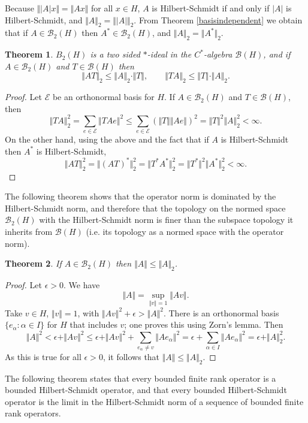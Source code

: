 \documentclass{article}
\newcommand{\norm}[1]{\Vert #1 \Vert}
\newtheorem{theorem}{Theorem}
\begin{document}
Because $\norm{|A|x}=\norm{Ax}$ for all $x \in H$, $A$ is Hilbert-Schmidt if and only if $|A|$ is Hilbert-Schmidt, and
$\norm{A}_2 = \norm{|A|}_2$.
From Theorem \ref{basisindependent} we obtain that if $A \in \mathscr{B}_2(H)$ then $A^* \in \mathscr{B}_2(H)$, and 
$\norm{A}_2 = \norm{A^*}_2$.


\begin{theorem}
$B_2(H)$ is a two sided $*$-ideal in the $C^*$-algebra $\mathscr{B}(H)$, and if $A \in \mathscr{B}_2(H)$ and $T \in \mathscr{B}(H)$ then
\[
\norm{AT}_2 \leq \norm{A}_2 \cdot \norm{T}, \qquad \norm{TA}_2 \leq \norm{T} \cdot \norm{A}_2.
\]
\label{HSideal}
\end{theorem}
\begin{proof}
Let $\mathscr{E}$ be an orthonormal basis for $H$.
If $A \in \mathscr{B}_2(H)$ and $T \in \mathscr{B}(H)$, then
\[
\norm{TA}_2^2=\sum_{e \in \mathscr{E}} \norm{TAe}^2 \leq \sum_{e \in \mathscr{E}} \left( \norm{T} \norm{Ae}\right)^2 = \norm{T}^2\norm{A}_2^2 < \infty.
\]
On the other hand, using the above and the fact that if $A$ is Hilbert-Schmidt then $A^*$ is Hilbert-Schmidt,
\[
\norm{AT}_2^2 = \norm{(AT)^*}_2^2 = \norm{T^*A^*}_2^2 = \norm{T^*}^2 \norm{A^*}_2^2 < \infty.
\]
\end{proof}


The following theorem shows that the operator norm is dominated by the Hilbert-Schmidt norm, and therefore that the topology on the normed space
$\mathscr{B}_2(H)$ with the Hilbert-Schmidt norm is finer than the subspace topology it inherits from $\mathscr{B}(H)$ (i.e. its topology as a normed space with the operator norm).


\begin{theorem}
If $A \in \mathscr{B}_2(H)$ then $\norm{A} \leq \norm{A}_2$.
\label{HSdominated}
\end{theorem}
\begin{proof}
Let $\epsilon>0$. We have
\[
\norm{A} = \sup_{\norm{v} = 1} \norm{Av}.
\]
Take $v \in H$, $\norm{v}=1$, with $\norm{Av}^2+\epsilon>\norm{A}^2$. There
 is an orthonormal basis $\{e_\alpha: \alpha \in I\}$ for $H$ that includes
$v$; one proves this using Zorn's lemma. Then
\[
\norm{A}^2 <\epsilon+ \norm{Av}^2 \leq \epsilon + \norm{Av}^2 + \sum_{e_\alpha \neq v} \norm{Ae_\alpha}^2
=\epsilon+\sum_{\alpha \in I} \norm{Ae_\alpha}^2 = \epsilon + \norm{A}_2^2.
\]
As this is true for all $\epsilon>0$, it follows that $\norm{A} \leq \norm{A}_2$.
\end{proof}


The following theorem states that every bounded finite rank operator is a bounded Hilbert-Schmidt operator, and that every bounded Hilbert-Schmidt operator
is the limit in the Hilbert-Schmidt norm  of a sequence of bounded finite rank operators.
\end{document}
